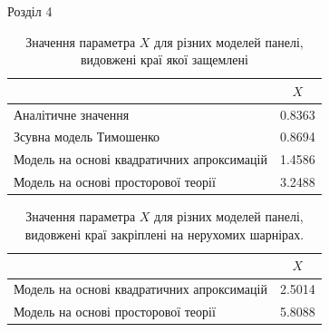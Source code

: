\documentclass[8pt]{beamer}
\numberwithin{figure}{section}
\numberwithin{equation}{section}
\numberwithin{table}{section}
\begin{document}
\begin{frame}{Розділ 4}
\begin{table}[h!]
\caption{Значення параметра $X$ для різних моделей панелі, видовжені краї якої защемлені}
\centering
 \begin{tabular}{| l | c |} 
 \hline
 & $X$ \\ 
 \hline
 Аналітичне значення\footnotemark & 0.8363 \\ 
 \hline
 Зсувна модель Тимошенко & 0.8694 \\ 
 \hline
 Модель на основі квадратичних апроксимацій & 1.4586 \\ 
 \hline
 Модель на основі просторової теорії & 3.2488 \\
 \hline
\end{tabular}
\end{table}

\begin{table}[h!]
\caption{Значення параметра $X$ для різних моделей панелі, видовжені краї закріплені на нерухомих шарнірах.}
\centering
 \begin{tabular}{| l | c |} 
 \hline
 & $X$ \\ 
 \hline
 Модель на основі квадратичних апроксимацій & 2.5014 \\ 
 \hline
 Модель на основі просторової теорії & 5.8088 \\
 \hline
\end{tabular}
\end{table}


\end{frame}
\end{document}
